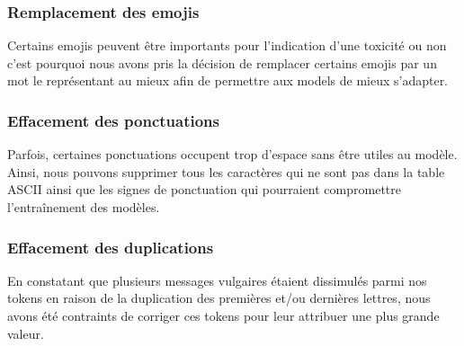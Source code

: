 \subsubsection*{Remplacement des emojis}

Certains emojis peuvent être importants pour l'indication d'une toxicité ou non c'est pourquoi nous avons pris la décision de remplacer certains emojis par un mot le représentant au mieux afin de permettre aux models de mieux s'adapter.

\subsubsection*{Effacement des ponctuations}

Parfois, certaines ponctuations occupent trop d'espace sans être utiles au modèle. Ainsi, nous pouvons supprimer tous les caractères qui ne sont pas dans la table ASCII ainsi que les signes de ponctuation qui pourraient compromettre l'entraînement des modèles.

\subsubsection*{Effacement des duplications}
En constatant que plusieurs messages vulgaires étaient dissimulés parmi nos tokens en raison de la duplication des premières et/ou dernières lettres, nous avons été contraints de corriger ces tokens pour leur attribuer une plus grande valeur.

